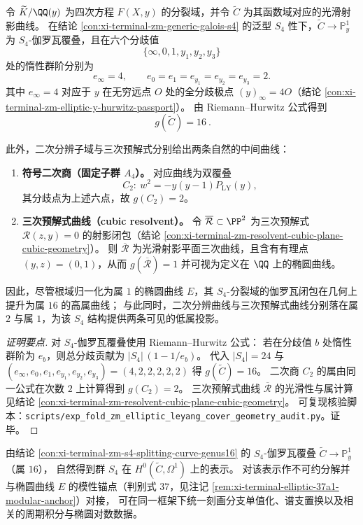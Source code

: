 \begin{conclusion}\label{con:xi-terminal-zm-s4-splitting-curve-genus16}
令 \(\widetilde{K}/\QQ(y)\) 为四次方程 \(F(X,y)\) 的分裂域，并令 \(\widetilde{C}\) 为其函数域对应的光滑射影曲线。
在结论 \ref{con:xi-terminal-zm-generic-galois-s4} 的泛型 \(S_4\) 性下，\(\widetilde{C}\to\mathbb P^1_y\) 为 \(S_4\)-伽罗瓦覆叠，且在六个分歧值
\[
\{\infty,0,1,y_1,y_2,y_3\}
\]
处的惰性群阶分别为
\[
e_\infty=4,\qquad e_0=e_1=e_{y_1}=e_{y_2}=e_{y_3}=2.
\]
其中 \(e_\infty=4\) 对应于 \(y\) 在无穷远点 \(O\) 处的全分歧极点 \((y)_\infty=4O\)（结论 \ref{con:xi-terminal-zm-elliptic-y-hurwitz-passport}）。
由 Riemann--Hurwitz 公式得到
\[
\boxed{\ g(\widetilde{C})=16\ }.
\]

此外，二次分辨子域与三次预解式分别给出两条自然的中间曲线：
\begin{enumerate}
  \item \textbf{符号二次商（固定子群 \(A_4\)）。}
  对应曲线为双覆叠
  \[
  C_2:\ w^2=-y(y-1)P_{\mathrm{LY}}(y),
  \]
  其分歧点为上述六点，故 \(g(C_2)=2\)。
  \item \textbf{三次预解式曲线（cubic resolvent）。}
  令 \(\overline{\mathcal R}\subset\PP^{2}\) 为三次预解式 \(\mathscr R(z,y)=0\) 的射影闭包（结论 \ref{con:xi-terminal-zm-resolvent-cubic-plane-cubic-geometry}）。
  则 \(\overline{\mathcal R}\) 为光滑射影平面三次曲线，且含有有理点 \((y,z)=(0,1)\)，从而 \(g(\overline{\mathcal R})=1\) 并可视为定义在 \(\QQ\) 上的椭圆曲线。
\end{enumerate}
因此，尽管根域归一化为属 \(1\) 的椭圆曲线 \(E\)，其 \(S_4\)-分裂域的伽罗瓦闭包在几何上提升为属 \(16\) 的高属曲线；
与此同时，二次分辨曲线与三次预解式曲线分别落在属 \(2\) 与属 \(1\)，为该 \(S_4\) 结构提供两条可见的低属投影。
\end{conclusion}
\begin{proof}[证明要点]
对 \(S_4\)-伽罗瓦覆叠使用 Riemann--Hurwitz 公式：
若在分歧值 \(b\) 处惰性群阶为 \(e_b\)，则总分歧贡献为 \(|S_4|\,(1-1/e_b)\)。
代入 \(|S_4|=24\) 与 \((e_\infty,e_0,e_1,e_{y_1},e_{y_2},e_{y_3})=(4,2,2,2,2,2)\) 得 \(g(\widetilde{C})=16\)。
二次商 \(C_2\) 的属由同一公式在次数 \(2\) 上计算得到 \(g(C_2)=2\)。
三次预解式曲线 \(\overline{\mathcal R}\) 的光滑性与属计算见结论 \ref{con:xi-terminal-zm-resolvent-cubic-plane-cubic-geometry}。
可复现核验脚本：\texttt{scripts/exp\_fold\_zm\_elliptic\_leyang\_cover\_geometry\_audit.py}。证毕。
\end{proof}

\begin{remark}\label{rem:xi-terminal-zm-s4-closure-representation-periods}
由结论 \ref{con:xi-terminal-zm-s4-splitting-curve-genus16} 的 \(S_4\)-伽罗瓦覆叠 \(\widetilde{C}\to\mathbb P^1_y\)（属 \(16\)），
自然得到群 \(S_4\) 在 \(H^{0}(\widetilde{C},\Omega^{1})\) 上的表示。
对该表示作不可约分解并与椭圆曲线 \(E\) 的模性锚点（判别式 \(37\)，见注记 \ref{rem:xi-terminal-elliptic-37a1-modular-anchor}）对接，
可在同一框架下统一刻画分支单值化、谱支置换以及相关的周期积分与椭圆对数数据。
\end{remark}

